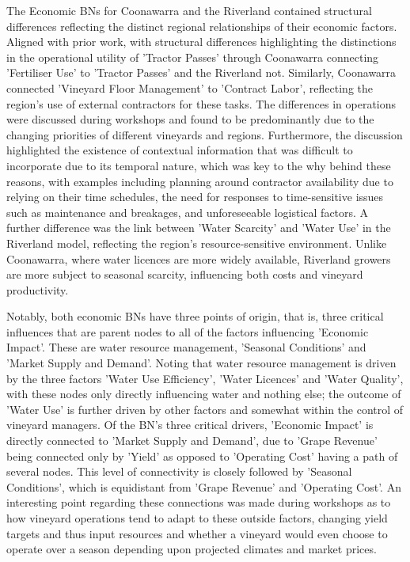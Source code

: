 \documentclass{article}
\begin{document}
The Economic BNs for Coonawarra and the Riverland contained structural differences reflecting the distinct regional relationships of their economic factors. Aligned with prior work, with structural differences highlighting the distinctions in the operational utility of 'Tractor Passes' through Coonawarra connecting 'Fertiliser Use' to 'Tractor Passes' and the Riverland not. Similarly, Coonawarra connected 'Vineyard Floor Management' to 'Contract Labor', reflecting the region’s use of external contractors for these tasks. The differences in operations were discussed during workshops and found to be predominantly due to the changing priorities of different vineyards and regions. Furthermore, the discussion highlighted the existence of contextual information that was difficult to incorporate due to its temporal nature, which was key to the why behind these reasons, with examples including planning around contractor availability due to relying on their time schedules, the need for responses to time-sensitive issues such as maintenance and breakages, and unforeseeable logistical factors. A further difference was the link between 'Water Scarcity' and 'Water Use' in the Riverland model, reflecting the region’s resource-sensitive environment. Unlike Coonawarra, where water licences are more widely available, Riverland growers are more subject to seasonal scarcity, influencing both costs and vineyard productivity.

Notably, both economic BNs have three points of origin, that is, three critical influences that are parent nodes to all of the factors influencing 'Economic Impact'. These are water resource management, 'Seasonal Conditions' and 'Market Supply and Demand'. Noting that water resource management is driven by the three factors 'Water Use Efficiency', 'Water Licences' and 'Water Quality', with these nodes only directly influencing water and nothing else; the outcome of 'Water Use' is further driven by other factors and somewhat within the control of vineyard managers. Of the BN's three critical drivers, 'Economic Impact' is directly connected to 'Market Supply and Demand', due to 'Grape Revenue' being connected only by 'Yield' as opposed to 'Operating Cost' having a path of several nodes. This level of connectivity is closely followed by 'Seasonal Conditions', which is equidistant from 'Grape Revenue' and 'Operating Cost'. An interesting point regarding these connections was made during workshops as to how vineyard operations tend to adapt to these outside factors, changing yield targets and thus input resources and whether a vineyard would even choose to operate over a season depending upon projected climates and market prices.
\end{document}
